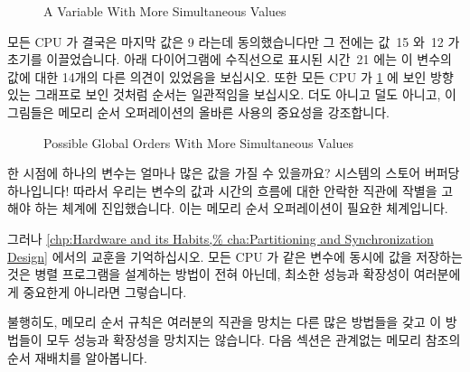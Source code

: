 \fi

\begin{figure}
\centering
{}
\caption{A Variable With More Simultaneous Values}
\end{figure}

모든 CPU 가 결국은 마지막 값은 9 라는데 동의했습니다만 그 전에는 값~15 와~12 가
초기를 이끌었습니다.
아래 다이어그램에 수직선으로 표시된 시간~21 에는 이 변수의 값에 대한 14개의
다른 의견이 있었음을 보십시오.
또한 모든 CPU 가
\cref{fig:memorder:Possible Global Orders With More Simultaneous Values}
에 보인 방향 있는 그래프로 보인 것처럼 순서는 일관적임을 보십시오.
더도 아니고 덜도 아니고, 이 그림들은 메모리 순서 오퍼레이션의 올바른 사용의
중요성을 강조합니다.

\begin{figure}[htb]
\centering
{}
\caption{Possible Global Orders With More Simultaneous Values}
\label{fig:memorder:Possible Global Orders With More Simultaneous Values}
\end{figure}

한 시점에 하나의 변수는 얼마나 많은 값을 가질 수 있을까요?
시스템의 스토어 버퍼당 하나입니다!
따라서 우리는 변수의 값과 시간의 흐름에 대한 안락한 직관에 작별을 고해야 하는
체계에 진입했습니다.
이는 메모리 순서 오퍼레이션이 필요한 체계입니다.

그러나
\cref{chp:Hardware and its Habits,%
cha:Partitioning and Synchronization Design} 에서의 교훈을 기억하십시오.
모든 CPU 가 같은 변수에 동시에 값을 저장하는 것은 병렬 프로그램을 설계하는
방법이 전혀 아닌데, 최소한 성능과 확장성이 여러분에게 중요한게 아니라면
그렇습니다.

불행히도, 메모리 순서 규칙은 여러분의 직관을 망치는 다른 많은 방법들을 갖고 이
방법들이 모두 성능과 확장성을 망치지는 않습니다.
다음 섹션은 관계없는 메모리 참조의 순서 재배치를 알아봅니다.

